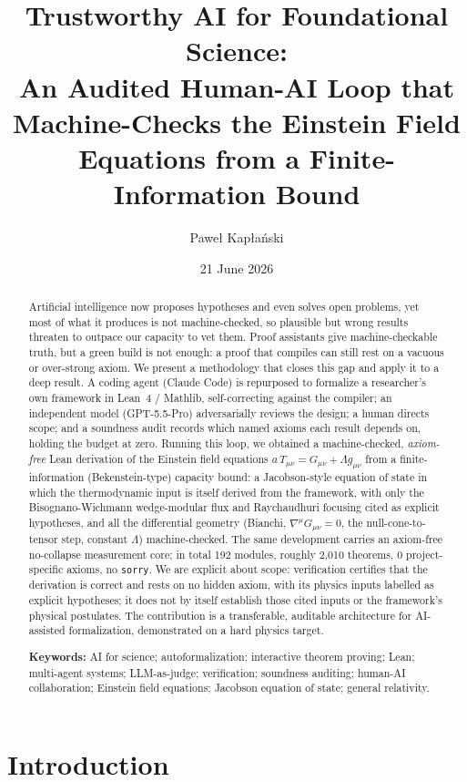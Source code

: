 \documentclass[11pt]{article}
\title{Trustworthy AI for Foundational Science:\\
An Audited Human-AI Loop that Machine-Checks the Einstein Field Equations from a Finite-Information Bound}
\author{Pawe\l{} Kap\l{}a\'nski}
\date{21 June 2026}
\begin{document}
\maketitle

\begin{abstract}
\noindent
Artificial intelligence now proposes hypotheses and even solves open problems, yet most of what
it produces is not machine-checked, so plausible but wrong results threaten to outpace our
capacity to vet them. Proof assistants give machine-checkable truth, but a green build is not
enough: a proof that compiles can still rest on a vacuous or over-strong axiom. We present a
methodology that closes this gap and apply it to a deep result. A coding agent (Claude Code) is
repurposed to formalize a researcher's own framework in Lean~4 / Mathlib, self-correcting against
the compiler; an independent model (GPT-5.5-Pro) adversarially reviews the design; a human directs
scope; and a soundness audit records which named axioms each result depends on, holding the budget
at zero. Running this loop, we obtained a machine-checked, \emph{axiom-free} Lean derivation of the
Einstein field equations $a\,T_{\mu\nu}=G_{\mu\nu}+\Lambda g_{\mu\nu}$ from a finite-information
(Bekenstein-type) capacity bound: a Jacobson-style equation of state in which the thermodynamic
input is itself derived from the framework, with only the Bisognano-Wichmann wedge-modular flux and
Raychaudhuri focusing cited as explicit hypotheses, and all the differential geometry (Bianchi,
$\nabla^\mu G_{\mu\nu}=0$, the null-cone-to-tensor step, constant $\Lambda$) machine-checked. The
same development carries an axiom-free
no-collapse measurement core; in total 192 modules, roughly 2{,}010 theorems, 0 project-specific
axioms, no \texttt{sorry}. We are explicit about scope: verification certifies that the derivation
is correct and rests on no hidden axiom, with its physics inputs labelled as explicit hypotheses;
it does not by itself establish those cited inputs or the framework's physical postulates. The
contribution is a transferable, auditable architecture for AI-assisted formalization, demonstrated
on a hard physics target.

\medskip
\noindent\textbf{Keywords:} AI for science; autoformalization; interactive theorem proving; Lean;
multi-agent systems; LLM-as-judge; verification; soundness auditing; human-AI collaboration;
Einstein field equations; Jacobson equation of state; general relativity.
\end{abstract}

\section{Introduction}
\end{document}
